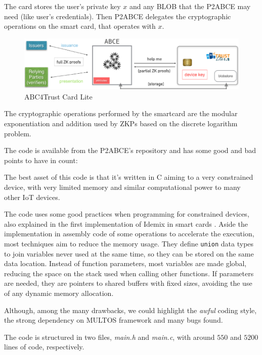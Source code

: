 The card stores the user's private key $x$ and any \ac{BLOB} that the P2ABCE may need (like user's credentials). Then P2ABCE delegates the cryptographic operations on the smart card, that operates with $x$.

\begin{figure}[bth]
	\begin{center}
		\includegraphics[width=\linewidth]{gfx/ABC4TCardLite}
	\end{center}
	\caption{ABC4Trust Card Lite}
	\label{fig:ABC4TCardLite}
\end{figure}

The cryptographic operations performed by the smartcard are the modular exponentiation and addition used by ZKPs based on the discrete logarithm problem.

\hfil

The code is available from the P2ABCE's repository and has some good and bad points to have in count:

The best asset of this code is that it's written in C aiming to a very constrained device, with very limited memory and similar computational power to many other IoT devices.

The code uses some good practices when programming for constrained devices, also explained in the first implementation of Idemix in smart cards \citep{vullers2013efficient}. Aside the implementation in assembly code of some operations to accelerate the execution, most techniques aim to reduce the memory usage. They define \texttt{union} data types to join variables never used at the same time, so they can be stored on the same data location. Instead of function parameters, most variables are made global, reducing the space on the stack used when calling other functions. If parameters are needed, they are pointers to shared buffers with fixed sizes, avoiding the use of any dynamic memory allocation.


Although, among the many drawbacks, we could highlight the \textit{awful} coding style, the strong dependency on MULTOS framework and many bugs found. 

The code is structured in two files, \textit{main.h} and \textit{main.c}, with around $550$ and $5200$ lines of code, respectively.

